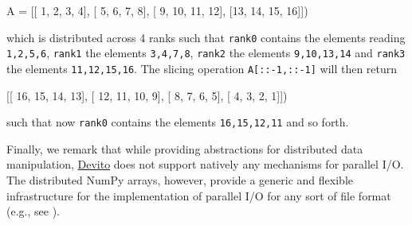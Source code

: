 \documentclass[conference]{IEEEtran}
\newenvironment{Shaded}{}{}
\newcommand{\DecValTok}[1]{\textcolor[rgb]{0.25,0.63,0.44}{{#1}}}
\newcommand{\NormalTok}[1]{{#1}}
\begin{document}
\begin{Shaded}
\begin{Highlighting}[]
\NormalTok{A = [[ }\DecValTok{1}\NormalTok{,  }\DecValTok{2}\NormalTok{,  }\DecValTok{3}\NormalTok{,  }\DecValTok{4}\NormalTok{],}
     \NormalTok{[ }\DecValTok{5}\NormalTok{,  }\DecValTok{6}\NormalTok{,  }\DecValTok{7}\NormalTok{,  }\DecValTok{8}\NormalTok{],}
     \NormalTok{[ }\DecValTok{9}\NormalTok{, }\DecValTok{10}\NormalTok{, }\DecValTok{11}\NormalTok{, }\DecValTok{12}\NormalTok{],}
     \NormalTok{[}\DecValTok{13}\NormalTok{, }\DecValTok{14}\NormalTok{, }\DecValTok{15}\NormalTok{, }\DecValTok{16}\NormalTok{]])}
\end{Highlighting}
\end{Shaded}

which is distributed across 4 ranks such that \texttt{rank\phantom{\ }0}
contains the elements reading
\texttt{1,\phantom{\ }2,\phantom{\ }5,\phantom{\ }6},
\texttt{rank\phantom{\ }1} the elements
\texttt{3,\phantom{\ }4,\phantom{\ }7,\phantom{\ }8},
\texttt{rank\phantom{\ }2} the elements
\texttt{9,\phantom{\ }10,\phantom{\ }13,\phantom{\ }14} and
\texttt{rank\phantom{\ }3} the elements
\texttt{11,\phantom{\ }12,\phantom{\ }15,\phantom{\ }16}. The slicing
operation \texttt{A{[}::-1,\phantom{\ }::-1{]}} will then return

\begin{Shaded}
\begin{Highlighting}[]
    \NormalTok{[[ }\DecValTok{16}\NormalTok{, }\DecValTok{15}\NormalTok{, }\DecValTok{14}\NormalTok{, }\DecValTok{13}\NormalTok{],}
     \NormalTok{[ }\DecValTok{12}\NormalTok{, }\DecValTok{11}\NormalTok{, }\DecValTok{10}\NormalTok{,  }\DecValTok{9}\NormalTok{],}
     \NormalTok{[  }\DecValTok{8}\NormalTok{,  }\DecValTok{7}\NormalTok{,  }\DecValTok{6}\NormalTok{,  }\DecValTok{5}\NormalTok{],}
     \NormalTok{[  }\DecValTok{4}\NormalTok{,  }\DecValTok{3}\NormalTok{,  }\DecValTok{2}\NormalTok{,  }\DecValTok{1}\NormalTok{]])}
\end{Highlighting}
\end{Shaded}

such that now \texttt{rank\phantom{\ }0} contains the elements
\texttt{16,\phantom{\ }15,\phantom{\ }12,\phantom{\ }11} and so forth.

Finally, we remark that while providing abstractions for distributed
data manipulation, \href{https://github.com/devitocodes/devito}{Devito}
does not support natively any mechanisms for parallel I/O. The
distributed NumPy arrays, however, provide a generic and flexible
infrastructure for the implementation of parallel I/O for any sort of
file format (e.g., see \cite{witte2018alf}).
\end{document}
